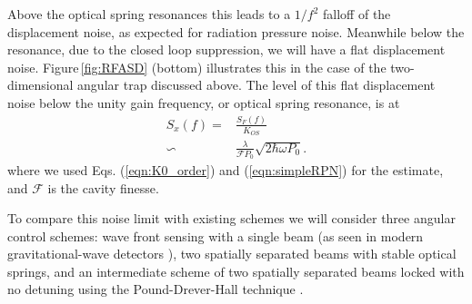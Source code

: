 Above the optical spring resonances this leads to a $1/f^2$ falloff of the displacement noise, as expected for radiation pressure noise. Meanwhile below the resonance, due to the closed loop suppression, we will have a flat displacement noise. %
Figure\,\ref{fig:RFASD} (bottom) illustrates this in the case of the two-dimensional angular trap discussed above. The level of this flat displacement noise below the unity gain frequency, or optical spring resonance, is at
\begin{align}
\label{eqn_newraddisp}
S_x(f) =& \frac{S_F(f)}{K_{OS}} \\
\backsim & \frac{\lambda}{\mathcal{F}{P_0}}\sqrt{2 \hbar \omega P_0}.
\end{align}
where we used Eqs. (\ref{eqn:K0_order}) and (\ref{eqn:simpleRPN}) for the estimate, and $\mathcal{F}$ is the cavity finesse.

To compare this noise limit with existing schemes we will consider three angular control schemes: wave front sensing with a single beam (as seen in modern gravitational-wave detectors \cite{Dooley13, Hirose10}), two spatially separated beams with stable optical springs, and an intermediate scheme of two spatially separated beams locked with no detuning using the Pound-Drever-Hall technique \cite{Black01}. 

